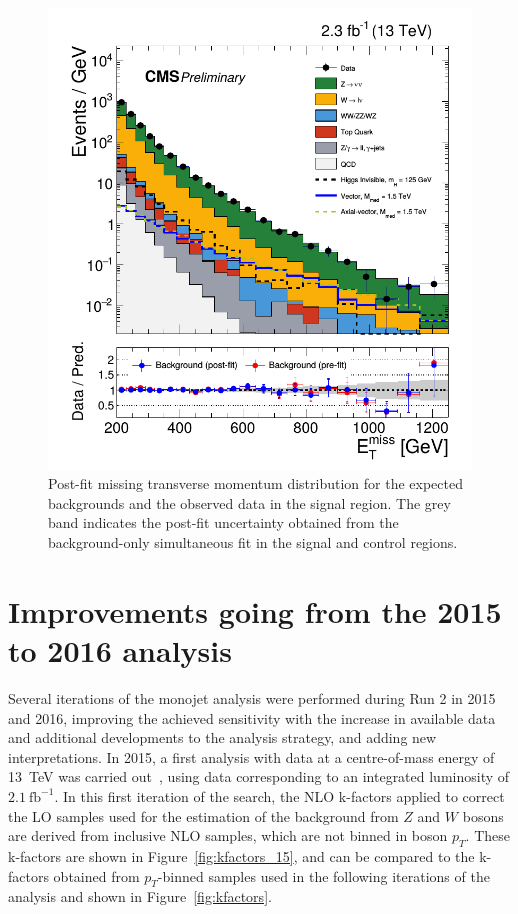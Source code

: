 \begin{figure}[ht]
  \centering
 \includegraphics[width=.7\textwidth]{results.png} 
 \caption{Post-fit missing transverse momentum distribution for the expected backgrounds and the observed data in the signal region. The grey band indicates the post-fit uncertainty obtained from the background-only simultaneous fit in the signal and control regions.}
 \label{fig:results}
\end{figure}

\section{Improvements going from the 2015 to 2016 analysis}
\label{sec:improvement}

Several iterations of the monojet analysis were performed during Run 2 in 2015 and 2016, improving the achieved sensitivity with the increase in available data and additional developments to the analysis strategy, and adding new interpretations. In 2015, a first analysis with data at a centre-of-mass energy of \SI{13}{TeV} was carried out~\cite{CMS:2015jdt}, using data corresponding to an integrated luminosity of $2.1\ \mathrm{fb}^{-1}$. In this first iteration of the search, the NLO k-factors applied to correct the \ac{LO} samples used for the estimation of the background from $Z$ and $W$ bosons are derived from inclusive \ac{NLO} samples, which are not binned in boson $p_T$. These k-factors are shown in Figure~\ref{fig:kfactors_15}, and can be compared to the k-factors obtained from $p_T$-binned samples used in the following iterations of the analysis and shown in Figure~\ref{fig:kfactors}.

